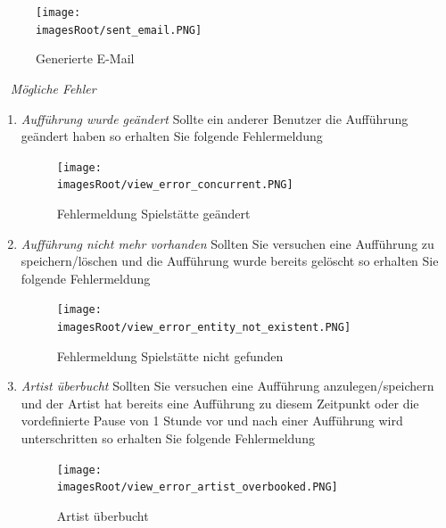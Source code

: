 \documentclass[11pt, a4paper, twoside]{article}   	%
\newcommand{\imagesRoot}{images}
\begin{document}
	\begin{figure}[h]
	\centering
	\texttt{[image: \\imagesRoot/sent\_email.PNG]}
	\caption
	{Generierte E-Mail}
\end{figure}
\ \newline
\newpage
\emph{Mögliche Fehler}
\begin{enumerate}
\item\emph{Aufführung wurde geändert}
\newline
Sollte ein anderer Benutzer die Aufführung geändert haben so erhalten Sie folgende Fehlermeldung
	\begin{figure}[h]
	\centering
	\texttt{[image: \\imagesRoot/view\_error\_concurrent.PNG]}
	\caption
	{Fehlermeldung Spielstätte geändert}
\end{figure}
\item\emph{Aufführung nicht mehr vorhanden}
\newline
Sollten Sie versuchen eine Aufführung zu speichern/löschen und die Aufführung wurde bereits gelöscht so erhalten Sie folgende Fehlermeldung
	\begin{figure}[h]
	\centering
	\texttt{[image: \\imagesRoot/view\_error\_entity\_not\_existent.PNG]}
	\caption
	{Fehlermeldung Spielstätte nicht gefunden}
\end{figure}	
\item\emph{Artist überbucht}
\newline
Sollten Sie versuchen eine Aufführung anzulegen/speichern und der Artist hat bereits eine Aufführung zu diesem Zeitpunkt oder die vordefinierte Pause von 1 Stunde vor und nach einer Aufführung wird unterschritten so erhalten Sie folgende Fehlermeldung
	\begin{figure}[h]
	\centering
	\texttt{[image: \\imagesRoot/view\_error\_artist\_overbooked.PNG]}
	\caption
	{Artist überbucht}
\end{figure}
\end{enumerate}
\ \newline
\end{document}
